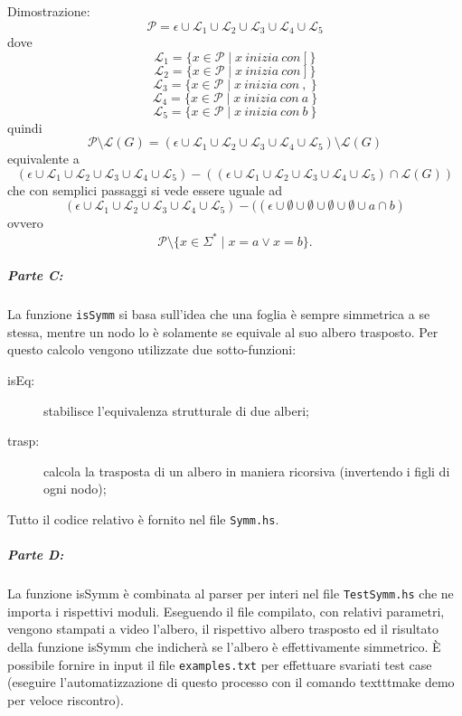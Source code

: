 \documentclass[a4paper, oneside, 11pt]{article}
\begin{document}
Dimostrazione:
\\
\[\mathcal{P}= \epsilon \cup \mathcal{L}_{1} \cup \mathcal{L}_{2} \cup \mathcal{L}_{3} \cup \mathcal{L}_{4} \cup \mathcal{L}_{5}\]
dove
\[\mathcal{L}_{1} = \{ x \in \mathcal{P} \mid x\ inizia\ con\ {[}\ \} \]
\[\mathcal{L}_{2} = \{ x \in \mathcal{P} \mid x\ inizia\ con\ {]}\ \} \]
\[\mathcal{L}_{3} = \{ x \in \mathcal{P} \mid x\ inizia\ con\ {,}\ \} \]
\[\mathcal{L}_{4} = \{ x \in \mathcal{P} \mid x\ inizia\ con\ {a}\ \} \]
\[\mathcal{L}_{5} = \{ x \in \mathcal{P} \mid x\ inizia\ con\ {b}\ \} \]
quindi
\[\mathcal{P}\setminus\mathcal{L}(G) = (\epsilon \cup \mathcal{L}_{1} \cup \mathcal{L}_{2} \cup \mathcal{L}_{3} \cup \mathcal{L}_{4} \cup \mathcal{L}_{5} )\setminus \mathcal{L}(G) \]
equivalente a
\[(\epsilon \cup \mathcal{L}_{1} \cup \mathcal{L}_{2} \cup \mathcal{L}_{3} \cup \mathcal{L}_{4} \cup \mathcal{L}_{5} )- %
( (\epsilon \cup \mathcal{L}_{1} \cup \mathcal{L}_{2} \cup \mathcal{L}_{3} \cup \mathcal{L}_{4} \cup \mathcal{L}_{5} )\cap \mathcal{L}(G) ) \]
che con semplici passaggi si vede essere uguale ad
\[(\epsilon \cup \mathcal{L}_{1} \cup \mathcal{L}_{2} \cup \mathcal{L}_{3} \cup \mathcal{L}_{4} \cup \mathcal{L}_{5} ) - ( (\epsilon \cup \emptyset \cup \emptyset  \cup \emptyset \cup \emptyset \cup {a} \cap {b} ) \]
ovvero
\[\mathcal{P}\setminus\{x\in\Sigma^{\ast}\mid x=a \vee x=b\}.\]



\newpage

\subparagraph*{Parte C:}
La funzione \texttt{isSymm} si basa sull'idea che una foglia \`e sempre simmetrica a se stessa, mentre un nodo lo \`e solamente se equivale al suo albero trasposto. Per questo calcolo vengono utilizzate due sotto-funzioni:
\begin{description}
  \item[isEq:] stabilisce l'equivalenza strutturale di due alberi;
  \item[trasp:] calcola la trasposta di un albero in maniera ricorsiva (invertendo i figli di ogni nodo);
\end{description}
\par
Tutto il codice relativo \`e fornito nel file \texttt{Symm.hs}.
\par

\subparagraph*{Parte D:}
La funzione isSymm \`e combinata al parser per interi nel file \texttt{TestSymm.hs} che ne importa i rispettivi moduli. Eseguendo il file compilato, con relativi parametri, vengono stampati a video l'albero, il rispettivo albero trasposto ed il risultato della funzione isSymm che indicher\`a se l'albero \`e effettivamente simmetrico.
\`E possibile fornire in input il file \texttt{examples.txt} per effettuare svariati test case (eseguire l'automatizzazione di questo processo con il comando texttt{make demo} per veloce riscontro).


\newpage
\end{document}

